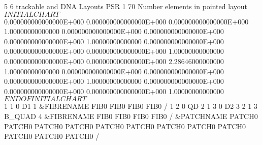 {{ 
\begin{ptccode}
           5           6  trackable and DNA Layouts \label{lin:mt:1}
PSR 1           											\label{lin:mt:psr1}                                                                                                       
          70  Number elements in pointed layout                                       \label{lin:mt:first}   
  $$$$$$$$$$$$$$$$$ INITIAL CHART $$$$$$$$$$$$$$$$$  \label{lin:mt:chart1}   
  0.000000000000000E+000  0.000000000000000E+000  0.000000000000000E+000
   1.00000000000000       0.000000000000000E+000  0.000000000000000E+000
  0.000000000000000E+000   1.00000000000000       0.000000000000000E+000
  0.000000000000000E+000  0.000000000000000E+000   1.00000000000000     
  0.000000000000000E+000  0.000000000000000E+000   2.28646000000000     
   1.00000000000000       0.000000000000000E+000  0.000000000000000E+000
  0.000000000000000E+000   1.00000000000000       0.000000000000000E+000
  0.000000000000000E+000  0.000000000000000E+000   1.00000000000000     
  $$$$$$$$$$$$$$$$$ END OF INITIAL CHART $$$$$$$$$$$$$$$$$ \label{lin:mt:chart2}   
    1        1  0 D1                              1             \label{lin:mt:firstf}            
 &FIBRENAME
 FIB0%
 FIB0%
 FIB0%
 FIB0%
 /
    1        2  0 QD                              2  \label{lin:mt:2}    
    1        3  0 D2                              3  \label{lin:mt:3} 
    2        1  3 B_QUAD                          4   \label{lin:mt:4}                 
 &FIBRENAME
 FIB0%
 FIB0%
 FIB0%
 FIB0%
 /
 &PATCHNAME
 PATCH0%
 PATCH0%
 PATCH0%
 PATCH0%
 PATCH0%
 PATCH0%
 PATCH0%
 PATCH0%
 PATCH0%
 PATCH0%
 PATCH0%
 PATCH0%
 /
\end{ptccode}

}}
